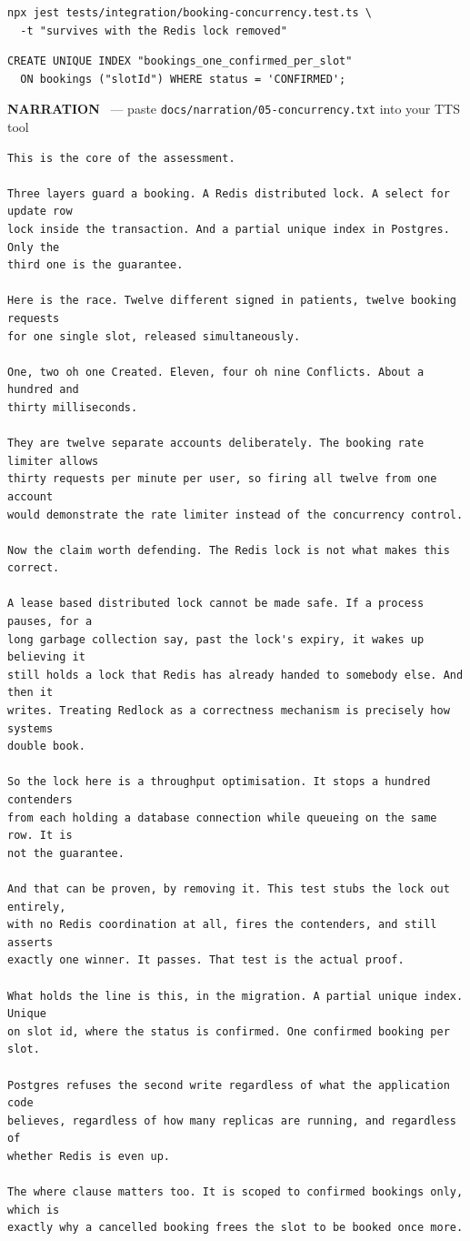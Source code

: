 \documentclass[11pt,a4paper]{article}
\newcommand{\voicehdr}[1]{\vspace{4pt}\noindent\textcolor{voice}{\textbf{NARRATION}}%
  \ \textcolor{soft}{\small --- paste \texttt{docs/narration/#1.txt} into your TTS tool}\par\vspace{2pt}}
\begin{document}
\begin{lstlisting}
npx jest tests/integration/booking-concurrency.test.ts \
  -t "survives with the Redis lock removed"
\end{lstlisting}

\begin{lstlisting}
CREATE UNIQUE INDEX "bookings_one_confirmed_per_slot"
  ON bookings ("slotId") WHERE status = 'CONFIRMED';
\end{lstlisting}

\voicehdr{05-concurrency}
\begin{lstlisting}[style=tts]
This is the core of the assessment.

Three layers guard a booking. A Redis distributed lock. A select for update row
lock inside the transaction. And a partial unique index in Postgres. Only the
third one is the guarantee.

Here is the race. Twelve different signed in patients, twelve booking requests
for one single slot, released simultaneously.

One, two oh one Created. Eleven, four oh nine Conflicts. About a hundred and
thirty milliseconds.

They are twelve separate accounts deliberately. The booking rate limiter allows
thirty requests per minute per user, so firing all twelve from one account
would demonstrate the rate limiter instead of the concurrency control.

Now the claim worth defending. The Redis lock is not what makes this correct.

A lease based distributed lock cannot be made safe. If a process pauses, for a
long garbage collection say, past the lock's expiry, it wakes up believing it
still holds a lock that Redis has already handed to somebody else. And then it
writes. Treating Redlock as a correctness mechanism is precisely how systems
double book.

So the lock here is a throughput optimisation. It stops a hundred contenders
from each holding a database connection while queueing on the same row. It is
not the guarantee.

And that can be proven, by removing it. This test stubs the lock out entirely,
with no Redis coordination at all, fires the contenders, and still asserts
exactly one winner. It passes. That test is the actual proof.

What holds the line is this, in the migration. A partial unique index. Unique
on slot id, where the status is confirmed. One confirmed booking per slot.

Postgres refuses the second write regardless of what the application code
believes, regardless of how many replicas are running, and regardless of
whether Redis is even up.

The where clause matters too. It is scoped to confirmed bookings only, which is
exactly why a cancelled booking frees the slot to be booked once more.
\end{lstlisting}
\end{document}
